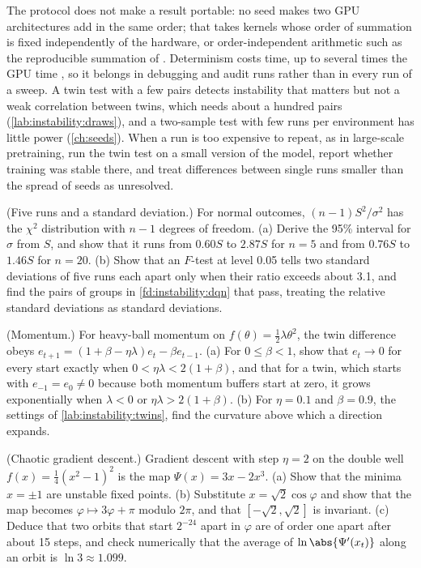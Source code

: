 \begin{refsection}
The protocol does not make a result portable: no seed makes two GPU architectures add in the same order; that takes kernels whose order of summation is fixed independently of the hardware, or order-independent arithmetic such as the reproducible summation of \textcite{DemmelNguyen2015}. Determinism costs time, up to several times the GPU time \parencite{ZhuangEtAl2022}, so it belongs in debugging and audit runs rather than in every run of a sweep. A twin test with a few pairs detects instability that matters but not a weak correlation between twins, which needs about a hundred pairs (\cref{lab:instability:draws}), and a two-sample test with few runs per environment has little power (\cref{ch:seeds}). When a run is too expensive to repeat, as in large-scale pretraining, run the twin test on a small version of the model, report whether training was stable there, and treat differences between single runs smaller than the spread of seeds as unresolved.

\begin{exercises}
\item \consolidation (Five runs and a standard deviation.) For normal outcomes, $(n-1)S^2/\sigma^2$ has the $\chi^2$ distribution with $n-1$ degrees of freedom. (a) Derive the 95\% interval for $\sigma$ from $S$, and show that it runs from $0.60S$ to $2.87S$ for $n=5$ and from $0.76S$ to $1.46S$ for $n=20$. (b) Show that an $F$-test at level 0.05 tells two standard deviations of five runs each apart only when their ratio exceeds about 3.1, and find the pairs of groups in \cref{fd:instability:dqn} that pass, treating the relative standard deviations as standard deviations.\label{ex:instability:sdinterval}

\item \consolidation (Momentum.) For heavy-ball momentum on $f(\theta)=\frac12\lambda\theta^2$, the twin difference obeys $e_{t+1}=(1+\beta-\eta\lambda)e_t-\beta e_{t-1}$. (a) For $0\le\beta<1$, show that $e_t\to0$ for every start exactly when $0<\eta\lambda<2(1+\beta)$, and that for a twin, which starts with $e_{-1}=e_0\ne0$ because both momentum buffers start at zero, it grows exponentially when $\lambda<0$ or $\eta\lambda>2(1+\beta)$. (b) For $\eta=0.1$ and $\beta=0.9$, the settings of \cref{lab:instability:twins}, find the curvature above which a direction expands. 

\item \consolidation\hard (Chaotic gradient descent.) Gradient descent with step $\eta=2$ on the double well $f(x)=\frac14(x^2-1)^2$ is the map $\Psi(x)=3x-2x^3$. (a) Show that the minima $x=\pm1$ are unstable fixed points. (b) Substitute $x=\sqrt2\cos\varphi$ and show that the map becomes $\varphi\mapsto3\varphi+\pi$ modulo $2\pi$, and that $[-\sqrt2,\sqrt2]$ is invariant. (c) Deduce that two orbits that start $2^{-24}$ apart in $\varphi$ are of order one apart after about 15 steps, and check numerically that the average of $\ln\abs{\Psi'(x_t)}$ along an orbit is $\ln3\approx1.099$. \label{ex:instability:doublewell}


\end{exercises}
\end{refsection}
